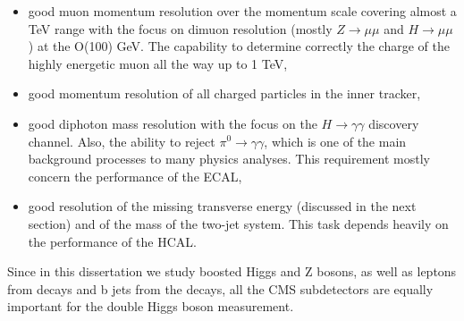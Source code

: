 \begin{normalsize}
\begin{itemize}
\item good muon momentum resolution over the momentum scale covering almost a TeV range with the focus on dimuon resolution (mostly $Z \rightarrow \mu \mu$ and $H \rightarrow \mu \mu$) at the O(100) GeV. The capability to determine correctly the charge of the highly energetic muon all the way up to 1 TeV,
\item good momentum resolution of all charged particles in the inner tracker,
\item good diphoton mass resolution with the focus on the $H \rightarrow \gamma \gamma$ discovery channel. Also, the ability to reject $\pi^0 \rightarrow \gamma \gamma$, which is one of the main background processes to many physics analyses.  This requirement mostly concern the performance of the ECAL,
\item good resolution of the missing transverse energy (discussed in the next section) and of the mass of the two-jet system. This task depends heavily on the performance of the HCAL.
\end{itemize}

Since in this dissertation we study boosted Higgs and Z bosons, as well as leptons from \Zll decays and b jets from the \HBB decays, all the CMS subdetectors are equally important for the double Higgs boson measurement.



\end{normalsize}       %
 
